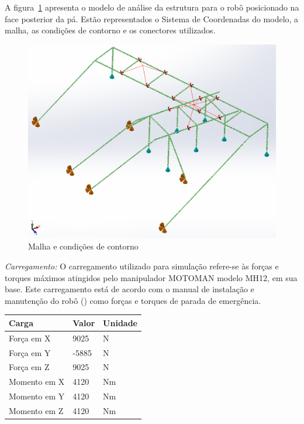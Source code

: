 A figura~\ref{fig::contorno} apresenta o modelo de análise da estrutura para o
robô posicionado na face posterior da pá. Estão representados o Sistema de
Coordenadas do modelo, a malha, as condições de contorno e os conectores
utilizados.

\begin{figure}[h!]
	\centering
	\includegraphics[width=0.9\columnwidth]{method/figs/dimensionamento/contorno}
	\caption{Malha e condições de contorno}
    \label{fig::contorno}
\end{figure}

\textit{Carregamento:} O carregamento utilizado para simulação
refere-se às forças e torques máximos atingidos pelo manipulador MOTOMAN modelo MH12, em
sua base. Este carregamento está de acordo com o manual de instalação e
manutenção do robô (\cite{MH12_manual}) como forças e torques de parada de
emergência.

\begin{center}
\centering
\begin{tabular}{|l|l|l|}
\hline
\textbf{Carga}		   & \textbf{Valor} & \textbf{Unidade}   \\ \hline
Força em X		       & 9025           & N	                 \\ \hline
Força em Y			   & -5885          & N                  \\ \hline
Força em Z			   & 9025           & N                  \\ \hline
Momento em X		   & 4120           & Nm                 \\ \hline
Momento em Y		   & 4120           & Nm                 \\ \hline
Momento em Z		   & 4120           & Nm                 \\ \hline
\end{tabular}
\label{tab::carregamento}
\end{center}

